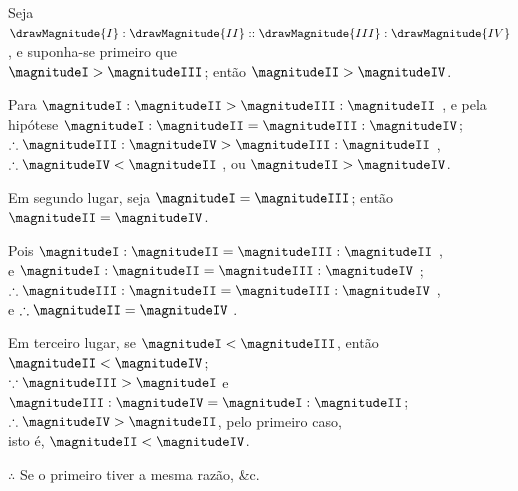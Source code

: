 \documentclass[booklanguage=brazilian]{byrnebook}
\begin{document}
\begin{center}
Seja $\drawMagnitude{I} : \drawMagnitude{II} :: \drawMagnitude{III} : \drawMagnitude{IV}$, e suponha-se primeiro que\\
$\magnitudeI > \magnitudeIII$; então $\magnitudeII > \magnitudeIV$.

Para $\magnitudeI : \magnitudeII > \magnitudeIII : \magnitudeII$ , e pela hipótese $\magnitudeI : \magnitudeII = \magnitudeIII : \magnitudeIV$;\\
$\therefore \magnitudeIII : \magnitudeIV > \magnitudeIII : \magnitudeII$ ,\\
$\therefore \magnitudeIV < \magnitudeII$ , ou $\magnitudeII > \magnitudeIV$.

Em segundo lugar, seja $\magnitudeI = \magnitudeIII$; então $\magnitudeII = \magnitudeIV$.

Pois $\magnitudeI : \magnitudeII = \magnitudeIII : \magnitudeII$ ,\\
e $\magnitudeI : \magnitudeII = \magnitudeIII : \magnitudeIV$ \byref{\hypref};\\
$\therefore \magnitudeIII : \magnitudeII = \magnitudeIII : \magnitudeIV$ ,\\
e $\therefore \magnitudeII = \magnitudeIV$ .

Em terceiro lugar, se $\magnitudeI < \magnitudeIII$, então $\magnitudeII < \magnitudeIV$;\\
$\because \magnitudeIII > \magnitudeI$ e $\magnitudeIII : \magnitudeIV = \magnitudeI : \magnitudeII$;\\ %
$\therefore \magnitudeIV > \magnitudeII$, pelo primeiro caso,\\
isto é, $\magnitudeII < \magnitudeIV$.

$\therefore$ Se o primeiro tiver a mesma razão, \&c.
\end{center}

\vfill\pagebreak

\label{prop:V.XV}
\end{document}
